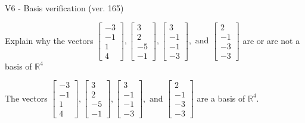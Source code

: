 \begin{exercise}
  \begin{exerciseTitle}V6 - Basis verification (ver. 165)\end{exerciseTitle}
  \begin{exerciseStatement}
    Explain why the vectors \(\left[\begin{array}{r}
-3 \\
-1 \\
1 \\
4
\end{array}\right] , \left[\begin{array}{r}
3 \\
2 \\
-5 \\
-1
\end{array}\right] , \left[\begin{array}{r}
3 \\
-1 \\
-1 \\
-3
\end{array}\right] , \text{ and } \left[\begin{array}{r}
2 \\
-1 \\
-3 \\
-3
\end{array}\right]\) are or are not a basis of \(\mathbb{R}^4\)	


  \end{exerciseStatement}
  \begin{exerciseAnswer}
   The vectors \(\left[\begin{array}{r}
-3 \\
-1 \\
1 \\
4
\end{array}\right] , \left[\begin{array}{r}
3 \\
2 \\
-5 \\
-1
\end{array}\right] , \left[\begin{array}{r}
3 \\
-1 \\
-1 \\
-3
\end{array}\right] , \text{ and } \left[\begin{array}{r}
2 \\
-1 \\
-3 \\
-3
\end{array}\right]\) 
  	 are  a basis of \(\mathbb{R}^4\).
  


  \end{exerciseAnswer}
\end{exercise}